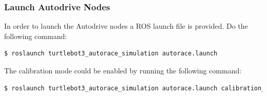\begin{frame}[fragile]
	\frametitle{Launch Autodrive Nodes}
	In order to launch the Autodrive nodes a ROS launch file is provided. Do the following command:
\begin{lstlisting}[language=bash]
$ roslaunch turtlebot3_autorace_simulation autorace.launch
\end{lstlisting}

The calibration mode could be enabled by running the following command:
\begin{lstlisting}[language=bash]
$ roslaunch turtlebot3_autorace_simulation autorace.launch calibration_mode:=calibration
\end{lstlisting}
\end{frame}
